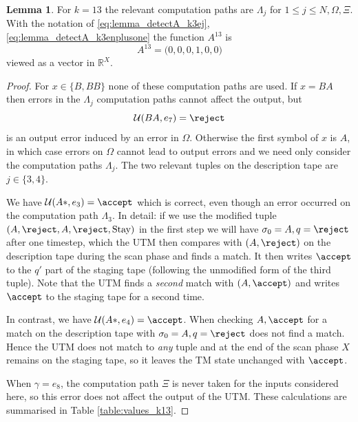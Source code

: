 \documentclass[english,letter paper,12pt,reqno]{article}
\theoremstyle{definition}
\newtheorem{lemma}[theorem]{Lemma}
\def\be{\begin{equation}}
\def\ee{\end{equation}}
\begin{document}
\begin{lemma}\label{lemma:detectA_k13} For $k = 13$ the relevant computation paths are $\Lambda_j$ for $1 \le j \le N,\Omega, \Xi$. With the notation of \eqref{eq:lemma_detectA_k3ej}, \eqref{eq:lemma_detectA_k3enplusone} the function $A^{13}$ is
\be
A^{13} = \big( 0, 0, 0, 1, 0, 0 \big)
\ee
viewed as a vector in $\mathbb{R}^X$.
\end{lemma}
\begin{proof}
For $x \in \{B, BB\}$ none of these computation paths are used. If $x = BA$ then errors in the $\Lambda_j$ computation paths cannot affect the output, but
\[
\mathcal{U}(BA, e_7) = \reject
\]
is an output error induced by an error in $\Omega$. Otherwise the first symbol of $x$ is $A$, in which case errors on $\Omega$ cannot lead to output errors and we need only consider the computation paths $\Lambda_j$. The two relevant tuples on the description tape are $j \in \{3,4\}$.

We have $\mathcal{U}(A*, e_3) = \accept$ which is correct, even though an error occurred on the computation path $\Lambda_3$. In detail: if we use the modified tuple $(A, \reject, A, \reject, \text{Stay})$ in the first step we will have $\sigma_0 = A, q = \reject$ after one timestep, which the UTM then compares with $(A, \reject)$ on the description tape during the scan phase and finds a match. It then writes $\accept$ to the $q'$ part of the staging tape (following the unmodified form of the third tuple). Note that the UTM finds a \emph{second} match with $(A, \accept)$ and writes $\accept$ to the staging tape for a second time.

In contrast, we have $\mathcal{U}(A*, e_4) = \accept$. When checking $A, \accept$ for a match on the description tape with $\sigma_0 = A, q = \reject$ does not find a match. Hence the UTM does not match to \emph{any} tuple and at the end of the scan phase $X$ remains on the staging tape, so it leaves the TM state unchanged with $\accept$.

When $\gamma = e_8$, the computation path $\Xi$ is never taken for the inputs considered here, so this error does not affect the output of the UTM. These calculations are summarised in Table \ref{table:values_k13}.
\end{proof}
\end{document}
